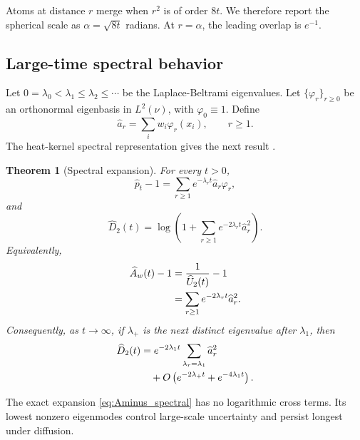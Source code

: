 \documentclass[twoside]{article}
\newtheorem{theorem}{Theorem}
\theoremstyle{definition}
\theoremstyle{remark}
\begin{document}
Atoms at distance $r$ merge when $r^2$ is of order $8t$. We therefore report the spherical scale as $\alpha=\sqrt{8t}$ radians. At $r=\alpha$, the leading overlap is $e^{-1}$.

\subsection{Large-time spectral behavior}

Let $0=\lambda_0<\lambda_1\le\lambda_2\le\cdots$ be the Laplace-Beltrami eigenvalues. Let $\{\varphi_r\}_{r\ge0}$ be an orthonormal eigenbasis in $L^2(\nu)$, with $\varphi_0\equiv1$. Define
\begin{equation*}
  \widehat a_r=\sum_iw_i\varphi_r(x_i),\qquad r\ge1.
\end{equation*}
The heat-kernel spectral representation gives the next result
\citep{rosenberg_1997_LaplacianRiemannianManifold, grigoryan_2009_HeatKernelAnalysis}.

\begin{theorem}[Spectral expansion]
\label{thm:spectral}
For every $t>0$,
\begin{equation}
  \widehat p_t-1=\sum_{r\ge1}e^{-\lambda_rt}\widehat a_r\varphi_r,
  \label{eq:pt_spectral}
\end{equation}
and
\begin{equation}
  \widehat D_2(t)=\log\left(1+\sum_{r\ge1}e^{-2\lambda_rt}\widehat a_r^2\right).
  \label{eq:D2_spectral}
\end{equation}
Equivalently,
\begin{align}
  \widehat A_w(t)-1
  &=\frac{1}{\widehat U_2(t)}-1 \notag\\
  &=\sum_{r\ge1}e^{-2\lambda_rt}\widehat a_r^2.
  \label{eq:Aminus_spectral}
\end{align}
Consequently, as $t\to\infty$, if $\lambda_+$ is the next distinct eigenvalue after $\lambda_1$, then
\begin{align*}
  \widehat D_2(t)
  &=e^{-2\lambda_1t}\sum_{\lambda_r=\lambda_1}\widehat a_r^2 \notag\\
  &\quad+O\left(e^{-2\lambda_+t}+e^{-4\lambda_1t}\right).
\end{align*}
\end{theorem}

The exact expansion \eqref{eq:Aminus_spectral} has no logarithmic cross terms. Its lowest nonzero eigenmodes control large-scale uncertainty and persist longest under diffusion.

\end{document}
